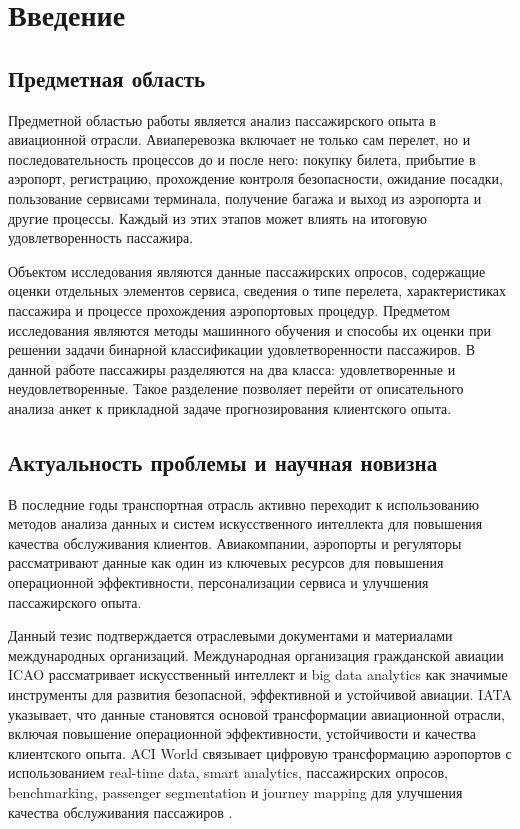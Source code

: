 \documentclass[14pt,a4paper]{extreport}
\begin{document}
\tableofcontents
\clearpage


\chapter{Введение}
\section{Предметная область}
Предметной областью работы является анализ пассажирского опыта в авиационной отрасли. Авиаперевозка включает не только сам перелет, но и последовательность процессов до и после него: покупку билета, прибытие в аэропорт, регистрацию, прохождение контроля безопасности, ожидание посадки, пользование сервисами терминала, получение багажа и выход из аэропорта и другие процессы. Каждый из этих этапов может влиять на итоговую удовлетворенность пассажира.

Объектом исследования являются данные пассажирских опросов, содержащие оценки отдельных элементов сервиса, сведения о типе перелета, характеристиках пассажира и процессе прохождения аэропортовых процедур. Предметом исследования являются методы машинного обучения и способы их оценки при решении задачи бинарной классификации удовлетворенности пассажиров. В данной работе пассажиры разделяются на два класса: удовлетворенные и неудовлетворенные. Такое разделение позволяет перейти от описательного анализа анкет к прикладной задаче прогнозирования клиентского опыта.

\section{Актуальность проблемы и научная новизна}
В последние годы транспортная отрасль активно переходит к использованию методов анализа данных и систем искусственного интеллекта для повышения качества обслуживания клиентов. Авиакомпании, аэропорты и регуляторы рассматривают данные как один из ключевых ресурсов для повышения операционной эффективности, персонализации сервиса и улучшения пассажирского опыта.

Данный тезис подтверждается отраслевыми документами и материалами международных организаций. Международная организация гражданской авиации ICAO рассматривает искусственный интеллект и big data analytics как значимые инструменты для развития безопасной, эффективной и устойчивой авиации. IATA указывает, что данные становятся основой трансформации авиационной отрасли, включая повышение операционной эффективности, устойчивости и качества клиентского опыта. ACI World связывает цифровую трансформацию аэропортов с использованием real-time data, smart analytics, пассажирских опросов, benchmarking, passenger segmentation и journey mapping для улучшения качества обслуживания пассажиров \cite{icao-ai,iata-data,aci-digital,aci-asq}.
\end{document}
